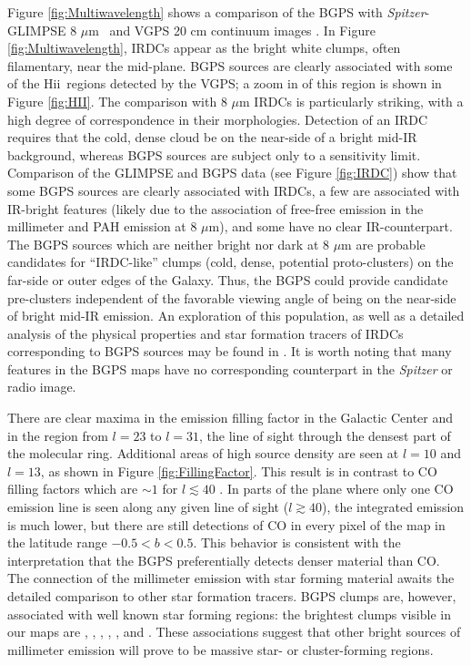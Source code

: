 \documentclass[12pt,preprint]{aastex}
\newcommand{\hii}{H{\sc ii}}
\newcommand{\mum}{\ensuremath{\mu \mathrm{m}}}
\newcommand{\lon}{\ensuremath{l}}
\begin{document}
Figure \ref{fig:Multiwavelength} shows a comparison of the BGPS with
{\em Spitzer}-GLIMPSE 8 \mum\ \citep{benjamin03} and VGPS 20 cm
continuum images \citep{stil06}.  In Figure \ref{fig:Multiwavelength},
IRDCs appear as the bright white clumps, often filamentary, near the
mid-plane.  BGPS sources are clearly associated with some of the \hii\
regions detected by the VGPS; a zoom in of this region is shown in
Figure \ref{fig:HII}.  The comparison with 8 $\mu$m IRDCs is
particularly striking, with a high degree of correspondence in their
morphologies.  Detection of an IRDC requires that the cold, dense
cloud be on the near-side of a bright mid-IR background, whereas BGPS
sources are subject only to a sensitivity limit.  Comparison of the
GLIMPSE and BGPS data (see Figure \ref{fig:IRDC}) show that some BGPS
sources are clearly associated with IRDCs, a few are associated with
IR-bright features (likely due to the association of free-free
emission in the millimeter and PAH emission at 8 $\mu$m), and some
have no clear IR-counterpart.  The BGPS sources which are neither
bright nor dark at 8 $\mu$m are probable candidates for ``IRDC-like''
clumps (cold, dense, potential proto-clusters) on the far-side or
outer edges of the Galaxy.  Thus, the BGPS could provide candidate
pre-clusters independent of the favorable viewing angle of being on
the near-side of bright mid-IR emission.  An exploration of this
population, as well as a detailed analysis of the physical properties
and star formation tracers of IRDCs corresponding to BGPS sources may
be found in \citet{battersby10}.  It is worth noting that many
features in the BGPS maps have no corresponding counterpart in the
{\em Spitzer} or radio image.

There are clear maxima in the emission filling factor in the Galactic
Center and in the region from $\lon=23$ to $\lon=31$, the line of
sight through the densest part of the molecular ring.  Additional
areas of high source density are seen at $\lon=10$ and $\lon=13$, as
shown in Figure \ref{fig:FillingFactor}.  This result is in contrast
to CO filling factors which are $\sim1$ for $l \lesssim 40$
\citep{dame01,jackson06}.  In parts of the plane where only one CO
emission line is seen along any given line of sight ($\lon\gtrsim40$),
the integrated emission is much lower, but there are still detections
of CO in every pixel of the \citet{dame01} map in the latitude range
$-0.5 < b < 0.5$.  This behavior is consistent with the interpretation
that the BGPS preferentially detects denser material than CO.  The
connection of the millimeter emission with star forming material
awaits the detailed comparison to other star formation tracers.  BGPS
clumps are, however, associated with well known star forming regions:
the brightest clumps visible in our maps are \object{Sgr B2},
, , , , and
\object{M 17}.  These associations suggest that other bright sources
of millimeter emission will prove to be massive star- or
cluster-forming regions.
\end{document}
